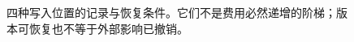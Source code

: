 \begin{figure}[htbp]
\centering

\caption{四种写入位置的记录与恢复条件。它们不是费用必然递增的阶梯；版本可恢复也不等于外部影响已撤销。}
\label{fig:ch10-where}
\end{figure}
